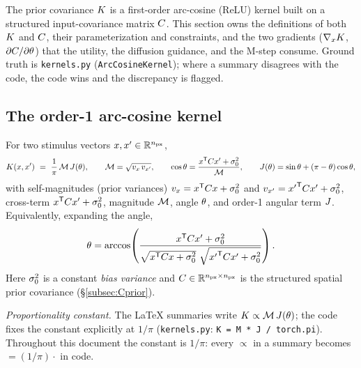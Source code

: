 The prior covariance $K$ is a first-order arc-cosine (ReLU) kernel built on a
structured input-covariance matrix $C$. This section owns the definitions of
both $K$ and $C$, their parameterization and constraints, and the two
gradients ($\nabla_xK$, $\partial C/\partial\theta$) that the utility, the
diffusion guidance, and the M-step consume. Ground truth is
\texttt{kernels.py} (\texttt{ArcCosineKernel}); where a summary disagrees with the
code, the code wins and the discrepancy is flagged.

\subsection{The order-1 arc-cosine kernel}
\label{subsec:acos}

\begin{definition}
For two stimulus vectors $x,x'\in\mathbb{R}^{n_{\mathrm{px}}}$,
\begin{equation}
K(x,x')\ =\ \frac{1}{\pi}\,\mathcal{M}\,J(\theta),
\qquad
\mathcal{M}=\sqrt{v_x\,v_{x'}},
\qquad
\cos\theta=\frac{x^{\mathsf{T}}C x'+\sigma_{0}^2}{\mathcal{M}},
\qquad
J(\theta)=\sin\theta+(\pi-\theta)\cos\theta,
\label{eq:acoskernel}
\end{equation}
with self-magnitudes (prior variances) $v_x=x^{\mathsf{T}}C x+\sigma_{0}^2$ and
$v_{x'}={x'}^{\mathsf{T}}C x'+\sigma_{0}^2$, cross-term
$x^{\mathsf{T}}C x'+\sigma_{0}^2$, magnitude $\mathcal{M}$, angle $\theta$, and order-1
angular term $J$. Equivalently, expanding the angle,
\begin{equation}
\theta=\arccos\!\left(
\frac{x^{\mathsf{T}}C x'+\sigma_{0}^2}
     {\sqrt{x^{\mathsf{T}}C x+\sigma_{0}^2}\ \sqrt{{x'}^{\mathsf{T}}C x'+\sigma_{0}^2}}
\right).
\end{equation}
Here $\sigma_{0}^2$ is a constant \emph{bias variance} and $C\in\mathbb{R}^{n_{\mathrm{px}}\times n_{\mathrm{px}}}$
is the structured spatial prior covariance (\S\ref{subsec:Cprior}).
\end{definition}

\emph{Proportionality constant.} The LaTeX summaries write $K\propto\mathcal{M}\,J(\theta)$;
the code fixes the constant explicitly at $1/\pi$
(\texttt{kernels.py}: \texttt{K = M * J / torch.pi}). Throughout this document the
constant is $1/\pi$: every $\propto$ in a summary becomes $=(1/\pi)\cdot$ in code.


